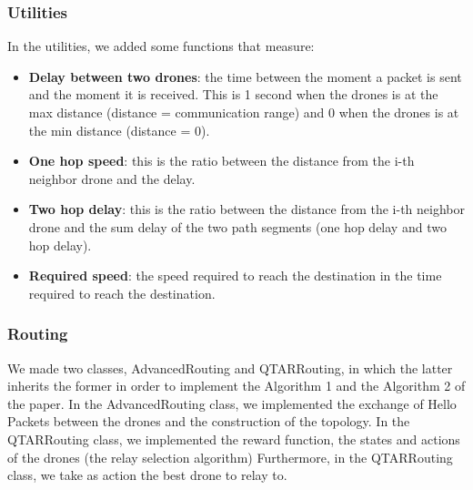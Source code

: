 \subsubsection{Utilities}
In the utilities, we added some functions that measure:
\begin{itemize}
    \item \textbf{Delay between two drones}: the time between the moment a packet is sent and the moment it is received. This is 1 second when the drones is at the max distance (distance = communication range) and 0 when the drones is at the min distance (distance = 0).
    \item \textbf{One hop speed}: this is the ratio between the distance from the i-th neighbor drone and the delay.
    \item \textbf{Two hop delay}: this is the ratio between the distance from the i-th neighbor drone and the sum delay of the two path segments (one hop delay and two hop delay).
    \item \textbf{Required speed}: the speed required to reach the destination in the time required to reach the destination.
\end{itemize}


\subsubsection{Routing}
We made two classes, AdvancedRouting and QTARRouting, in which the latter inherits the former in order to implement the Algorithm 1 and the Algorithm 2 of the paper.
In the AdvancedRouting class, we implemented the exchange of Hello Packets between the drones and the construction of the topology.
In the QTARRouting class, we implemented the reward function, the states and actions of the drones (the relay selection algorithm)
Furthermore, in the QTARRouting class, we take as action the best drone to relay to.

